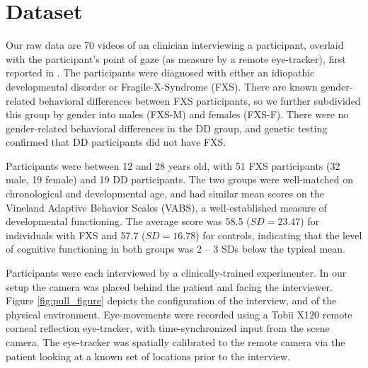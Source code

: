 \documentclass{llncs}
\begin{document}
  \section{Dataset}
  \vspace{-1.5em}
  Our raw data are 70 videos of an clinician interviewing a participant, overlaid with the participant's point of gaze (as measure by a remote eye-tracker), first reported in \cite{hall2015quantifying}.
  The participants were diagnosed with either an idiopathic developmental disorder or Fragile-X-Syndrome (FXS). There are known gender-related behavioral differences between FXS participants, so we further subdivided this group by gender into males (FXS-M) and females (FXS-F). There were no gender-related behavioral differences in the DD group, and genetic testing confirmed that DD participants did not have FXS.

  Participants were between 12 and 28 years old, with 51 FXS participants (32 male, 19 female) and 19 DD participants. The two groups were well-matched on chronological and developmental age, and had similar mean scores on the Vineland Adaptive Behavior Scales (VABS), a well-established measure of developmental functioning. The average score was 58.5 ($SD = 23.47$) for individuals with FXS and 57.7 ($SD= 16.78$) for controls, indicating that the level of cognitive functioning in both groups was 2 -- 3 SDs below the typical mean.

  Participants were each interviewed by a clinically-trained experimenter. In our setup the camera was placed behind the patient and facing the interviewer. Figure \ref{fig:pull_figure} depicts the configuration of the interview, and of the physical environment. Eye-movements were recorded using a Tobii X120 remote corneal reflection eye-tracker, with time-synchronized input from the scene camera. The eye-tracker was spatially calibrated to the remote camera via the patient looking at a known set of locations prior to the interview.
\end{document}
